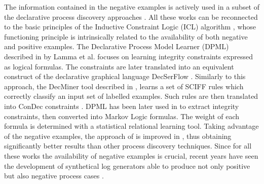 The information contained in the negative examples is actively used in a subset of the declarative process discovery approaches \cite{2007-Lamma,2009-Chesani,2010-Bellodi,2016-Bellodi}. All these works can be reconnected to the basic principles of the Inductive Constraint Logic (ICL) algorithm \cite{1995-DaRaedt}, whose functioning principle is intrinsically related to the availability of both negative and positive examples. 
The Declarative Process Model Learner (DPML) described in \cite{2007-Lamma} by Lamma et al. focuses on learning integrity constraints expressed as logical formulas. The constraints are later translated into an equivalent construct of the declarative graphical language DecSerFlow \cite{2006-Aalst}. Similarly to this approach, the DecMiner tool described in \cite{2009-Chesani}, learns a set of SCIFF rules \cite{2008-Alberti} which correctly classify an input set of labelled examples. Such rules are then translated into ConDec constraints \cite{2006-Pesic}. 
DPML has been later used in \cite{2010-Bellodi} to extract integrity constraints, then converted into Markov Logic formulas. The weight of each formula is determined with a statistical relational learning tool. %
Taking advantage of the negative examples, the approach of \cite{2010-Bellodi}  is improved in \cite{2016-Bellodi}, thus obtaining significantly better results than other process discovery techniques. 
Since for all these works the availability of negative examples is crucial, recent years have seen the development of synthetical log generators able to produce not only positive but also negative process cases \cite{2019-Chesani,2020-Loreti,2009-Goedertier, 2014-Stocker, 2010-Hee}.
 

